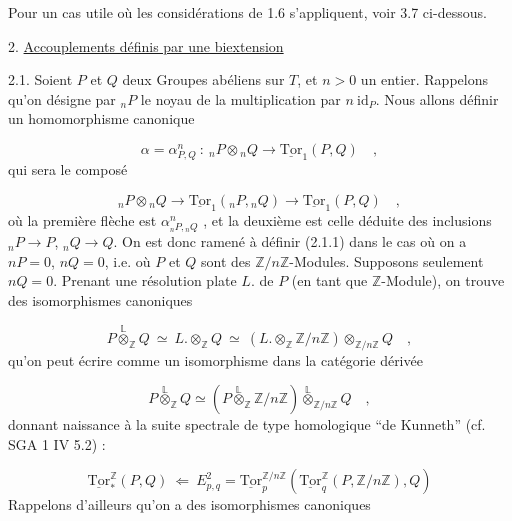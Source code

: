 Pour un cas utile où les considérations de 1.6 s'appliquent, voir 3.7 ci-dessous.


2. \underline{Accouplements définis par une biextension}

2.1.  Soient $P$ et $Q$ deux Groupes abéliens sur $T$, et $n > 0$ un entier. Rappelons qu'on désigne par ${}_nP$ le noyau de la multiplication par $n \ \mathrm{id}_P$. Nous allons définir un homomorphisme canonique 



\begin{equation}\tag{2.1.1}
 \alpha = \alpha^n_{P,Q} \ : \ {}_nP \otimes {}_nQ \longrightarrow \underline{\mathrm{Tor}}_1(P,Q) \quad ,
\end{equation}
qui sera le composé

\begin{equation}\tag{2.1.2}
{}_nP \otimes {}_nQ \longrightarrow \underline{\mathrm{Tor}}_1({}_nP,{}_nQ) \longrightarrow \underline{\mathrm{Tor}}_1(P,Q) \quad ,
\end{equation}
où la première flèche est $\alpha^n_{{}_nP,{}_nQ}$ , et la deuxième est celle déduite des inclusions ${}_nP \longrightarrow P$, ${}_nQ \longrightarrow Q$. On est donc ramené à définir (2.1.1) dans le cas où on a $nP = 0$, $nQ = 0$, i.e. où $P$ et $Q$ sont des $\mathbb{Z}/n\mathbb{Z}$-Modules. Supposons seulement $nQ = 0$. Prenant une résolution plate $L.$ de $P$ (en tant que $\mathbb{Z}$-Module), on trouve des isomorphismes canoniques

\begin{equation*}
P \overset{\mathbb{L}}{\otimes}_{\mathbb{Z}} Q \ \simeq \ L. \otimes_{\mathbb{Z}} Q \ \simeq \ (L. \otimes_{\mathbb{Z}} \mathbb{Z}/n\mathbb{Z}) \otimes_{\mathbb{Z}/n\mathbb{Z}} Q \quad ,
\end{equation*}
qu'on peut écrire comme un isomorphisme dans la catégorie dérivée

\begin{equation}\tag{2.1.3}
P \overset{\mathbb{L}}{\otimes}_{\mathbb{Z}} Q \simeq (P \overset{\mathbb{L}}{\otimes}_{\mathbb{Z}} \mathbb{Z}/n\mathbb{Z}) \overset{\mathbb{L}}{\otimes}_{\mathbb{Z}/n\mathbb{Z}} Q \quad ,
\end{equation}
donnant naissance à la suite spectrale de type homologique ``de Kunneth'' (cf. SGA 1 IV 5.2) :

\begin{equation}\tag{2.1.4}
\underline{\mathrm{Tor}}^{\mathbb{Z}}_*(P,Q) \ \Longleftarrow \ E^2_{p,q} = \underline{\mathrm{Tor}}^{\mathbb{Z}/n\mathbb{Z}}_p(\underline{\mathrm{Tor}}^{\mathbb{Z}}_q(P,\mathbb{Z}/n\mathbb{Z}),Q)
\end{equation}
Rappelons d'ailleurs qu'on a des isomorphismes canoniques

